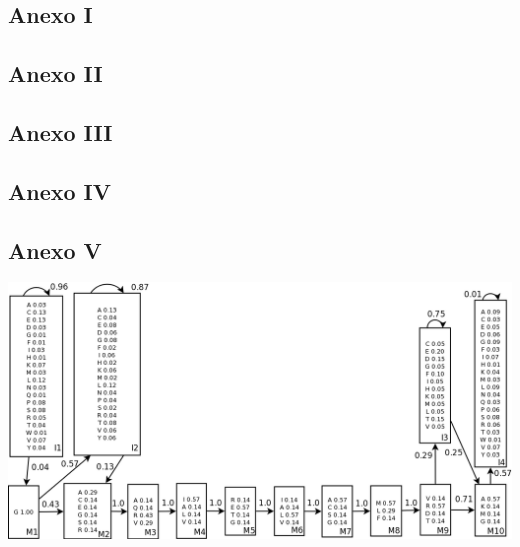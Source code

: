 \subsection{Anexo I}
\label{sec:anexo1}
\begin{small}
	
\end{small}

\newpage
\subsection{Anexo II}
\label{sec:anexo2}
\begin{small}
	
\end{small}

\newpage
\subsection{Anexo III}
\label{sec:anexo3}
\begin{small}
	
\end{small}

\newpage
\subsection{Anexo IV}
\label{sec:anexo4}
\begin{small}
	
\end{small}

\newpage
\subsection{Anexo V}
\label{sec:anexo5}
\includegraphics[angle=270,scale=0.55]{img/hmm}
